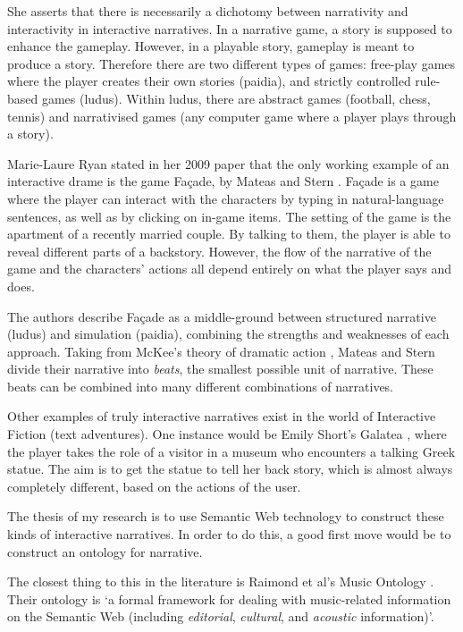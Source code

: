 \documentclass{llncs}
\begin{document}
She asserts that there is necessarily a dichotomy between narrativity and interactivity in interactive narratives. In a narrative game, a story is supposed to enhance the gameplay. However, in a playable story, gameplay is meant to produce a story. Therefore there are two different types of games: free-play games where the player creates their own stories (paidia), and strictly controlled rule-based games (ludus). Within ludus, there are abstract games (football, chess, tennis) and narrativised games (any computer game where a player plays through a story).

Marie-Laure Ryan stated in her 2009 paper \cite{Ryan2009} that the only working example of an interactive drame is the game Fa\c{c}ade, by Mateas and Stern \cite{Mateas}. Fa\c{c}ade is a game where the player can interact with the characters by typing in natural-language sentences, as well as by clicking on in-game items. The setting of the game is the apartment of a recently married couple. By talking to them, the player is able to reveal different parts of a backstory. However, the flow of the narrative of the game and the characters' actions all depend entirely on what the player says and does.

The authors describe Fa\c{c}ade as a middle-ground between structured narrative (ludus) and simulation (paidia), combining the strengths and weaknesses of each approach. Taking from McKee's theory of dramatic action \cite{mckee1997story}, Mateas and Stern divide their narrative into \emph{beats\/}, the smallest possible unit of narrative. These beats can be combined into many different combinations of narratives.

Other examples of truly interactive narratives exist in the world of Interactive Fiction (text adventures). One instance would be Emily Short's Galatea \cite{shortgalatea}, where the player takes the role of a visitor in a museum who encounters a talking Greek statue. The aim is to get the statue to tell her back story, which is almost always completely different, based on the actions of the user.

The thesis of my research is to use Semantic Web technology to construct these kinds of interactive narratives. In order to do this, a good first move would be to construct an ontology for 
narrative.

The closest thing to this in the literature is Raimond et al's Music Ontology \cite{Raimond2007}. Their ontology is `a formal framework for dealing with music-related information on the Semantic Web (including \emph{editorial}, \emph{cultural}, and \emph{acoustic} information)'.
\end{document}
